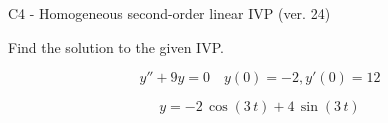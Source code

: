 \begin{exercise}
  \begin{exerciseTitle}C4 - Homogeneous second-order linear IVP (ver. 24)\end{exerciseTitle}
  \begin{exerciseStatement}
    
Find the solution to the given IVP.

    
\[y''+9y = 0 \hspace{1em} y(0) = -2 , y'(0) = 12\]

  \end{exerciseStatement}
  \begin{exerciseAnswer}
    
\[y= -2 \, \cos\left(3 \, t\right) + 4 \, \sin\left(3 \, t\right)\]

  \end{exerciseAnswer}
\end{exercise}